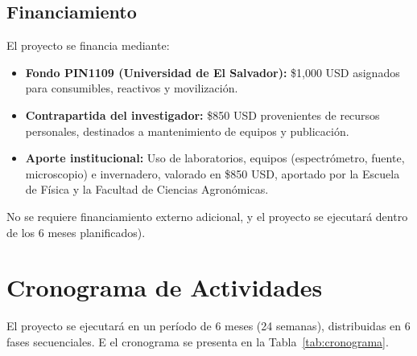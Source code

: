 \documentclass[12pt, a4paper]{article}
\begin{document}
	\subsection{Financiamiento}
	
	El proyecto se financia mediante:
	\begin{itemize}
		\item \textbf{Fondo PIN1109 (Universidad de El Salvador):} \$1,000 USD asignados para consumibles, reactivos y movilización.
		\item \textbf{Contrapartida del investigador:} \$850 USD provenientes de recursos personales, destinados a mantenimiento de equipos y publicación.
		\item \textbf{Aporte institucional:} Uso de laboratorios, equipos (espectrómetro, fuente, microscopio) e invernadero, valorado en \$850 USD, aportado por la Escuela de Física y la Facultad de Ciencias Agronómicas.
	\end{itemize}
	
	No se requiere financiamiento externo adicional, y el proyecto se ejecutará dentro de los 6 meses planificados).
	
	
\section{Cronograma de Actividades}

El proyecto se ejecutará en un período de 6 meses (24 semanas), distribuidas en 6 fases secuenciales. E el cronograma se presenta en la Tabla~\ref{tab:cronograma}.
\end{document}
